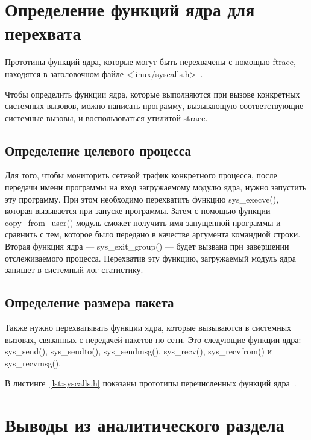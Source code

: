 \documentclass{bmstu}
\begin{document}

\section{Определение функций ядра для перехвата}

Прототипы функций ядра, которые могут быть перехвачены с помощью ftrace, находятся в заголовочном файле <linux/syscalls.h>~\cite{Syscalls}.

Чтобы определить функции ядра, которые выполняются при вызове конкретных системных вызовов, можно написать программу, вызывающую соответствующие системные вызовы, и воспользоваться утилитой strace.

\subsection{Определение целевого процесса}

Для того, чтобы мониторить сетевой трафик конкретного процесса, после передачи имени программы на вход загружаемому модулю ядра, нужно запустить эту программу. 
При этом необходимо перехватить функцию sys\_execve(), которая вызывается при запуске программы. 
Затем с помощью функции copy\_from\_user() модуль сможет получить имя запущенной программы и сравнить с тем, которое было передано в качестве аргумента командной строки. 
Вторая функция ядра --- sys\_exit\_group() --- будет вызвана при завершении отслеживаемого процесса. 
Перехватив эту функцию, загружаемый модуль ядра запишет в системный лог статистику.

\subsection{Определение размера пакета}

Также нужно перехватывать функции ядра, которые вызываются в системных вызовах, связанных с передачей пакетов по сети. 
Это следующие функции ядра: sys\_send(), sys\_sendto(), sys\_sendmsg(), sys\_recv(), sys\_recvfrom() и sys\_recvmsg().

В листинге~\ref{lst:syscalls.h} показаны прототипы перечисленных функций ядра~\cite{Syscalls}.


\section*{Выводы из аналитического раздела}
\end{document}
